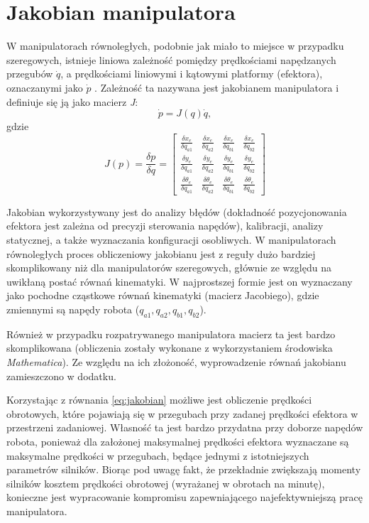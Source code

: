 \documentclass[printmode]{mgr}
\begin{document}
\section{Jakobian manipulatora}\label{sec:jakobian}
W manipulatorach równoległych, podobnie jak miało to miejsce w przypadku szeregowych, istnieje liniowa zależność pomiędzy prędkościami
napędzanych przegubów $\dot{q}$, a prędkościami liniowymi i kątowymi platformy (efektora), oznaczanymi jako $\dot{p}$ \cite{handbook}.
Zależność ta nazywana jest jakobianem manipulatora i definiuje się ją jako macierz \emph{J}:
\begin{equation}
\dot{p}=J(q)\dot{q},
\label{eq:jakobian}
\end{equation}
gdzie
\begin{equation}
J(p) = \frac{\delta p}{\delta q} = 
\begin{bmatrix}
\frac{\delta x_e}{\delta q_{a1}} & \frac{\delta x_e}{\delta q_{a2}} & \frac{\delta x_e}{\delta q_{b1}} & \frac{\delta x_e}{\delta q_{b2}} \\
\frac{\delta y_e}{\delta q_{a1}} & \frac{\delta y_e}{\delta q_{a2}} & \frac{\delta y_e}{\delta q_{b1}} & \frac{\delta y_e}{\delta q_{b2}} \\
\frac{\delta \theta_e}{\delta q_{a1}} & \frac{\delta \theta_e}{\delta q_{a2}} & \frac{\delta \theta_e}{\delta q_{b1}} & \frac{\delta \theta_e}{\delta q_{b2}}
\end{bmatrix}
\label{eq:jakobian2}
\end{equation}

Jakobian wykorzystywany jest do analizy błędów (dokładność pozycjonowania efektora jest zależna od precyzji sterowania napędów),
kalibracji, analizy statycznej, a także wyznaczania konfiguracji osobliwych. W manipulatorach 
równoległych proces obliczeniowy jakobianu
jest z reguły dużo bardziej skomplikowany niż dla manipulatorów szeregowych, głównie ze względu na uwikłaną postać równań kinematyki.
W najprostszej formie jest on wyznaczany
jako pochodne cząstkowe równań kinematyki (macierz Jacobiego), gdzie zmiennymi są napędy robota ($q_{a1}, q_{a2}, q_{b1}, q_{b2}$). 

Również w przypadku rozpatrywanego manipulatora macierz ta jest bardzo skomplikowana (obliczenia zostały wykonane z wykorzystaniem
środowiska \emph{Mathematica}). Ze względu na ich złożoność, wyprowadzenie równań jakobianu zamieszczono w dodatku. 


Korzystając z równania \eqref{eq:jakobian} możliwe jest obliczenie prędkości obrotowych, które pojawiają się w przegubach
przy zadanej prędkości efektora w przestrzeni zadaniowej. Własność ta jest bardzo przydatna przy doborze napędów robota,
ponieważ dla założonej maksymalnej prędkości efektora wyznaczane są maksymalne prędkości w przegubach, będące
jednymi z istotniejszych parametrów silników. Biorąc pod uwagę fakt, że przekładnie zwiększają momenty silników kosztem prędkości obrotowej
(wyrażanej w obrotach na minutę), konieczne jest wypracowanie kompromisu zapewniającego najefektywniejszą pracę manipulatora.
\end{document}
